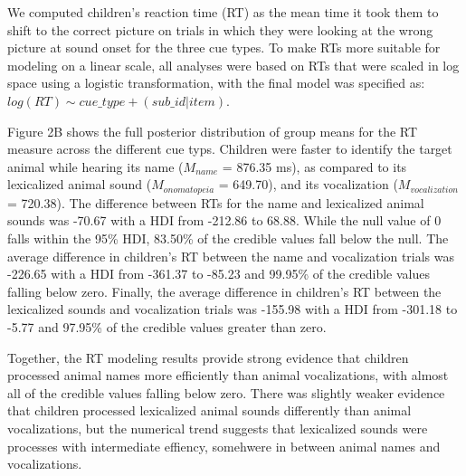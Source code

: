\documentclass[english,floatsintext,man]{apa6}
\theoremstyle{definition}
\theoremstyle{definition}
\theoremstyle{definition}
\theoremstyle{remark}
\begin{document}
We computed children's reaction time (RT) as the mean time it took them
to shift to the correct picture on trials in which they were looking at
the wrong picture at sound onset for the three cue types. To make RTs
more suitable for modeling on a linear scale, all analyses were based on
RTs that were scaled in log space using a logistic transformation, with
the final model was specified as:
\(log(RT) \sim cue\_type + (sub\_id | item)\).

Figure 2B shows the full posterior distribution of group means for the
RT measure across the different cue typs. Children were faster to
identify the target animal while hearing its name (\(M_{name}\) = 876.35
ms), as compared to its lexicalized animal sound (\(M_{onomatopeia}\) =
649.70), and its vocalization (\(M_{vocalization}\) = 720.38). The
difference between RTs for the name and lexicalized animal sounds was
-70.67 with a HDI from -212.86 to 68.88. While the null value of 0 falls
within the 95\% HDI, 83.50\% of the credible values fall below the null.
The average difference in children's RT between the name and
vocalization trials was -226.65 with a HDI from -361.37 to -85.23 and
99.95\% of the credible values falling below zero. Finally, the average
difference in children's RT between the lexicalized sounds and
vocalization trials was -155.98 with a HDI from -301.18 to -5.77 and
97.95\% of the credible values greater than zero.

Together, the RT modeling results provide strong evidence that children
processed animal names more efficiently than animal vocalizations, with
almost all of the credible values falling below zero. There was slightly
weaker evidence that children processed lexicalized animal sounds
differently than animal vocalizations, but the numerical trend suggests
that lexicalized sounds were processes with intermediate effiency,
somehwere in between animal names and vocalizations.
\end{document}
